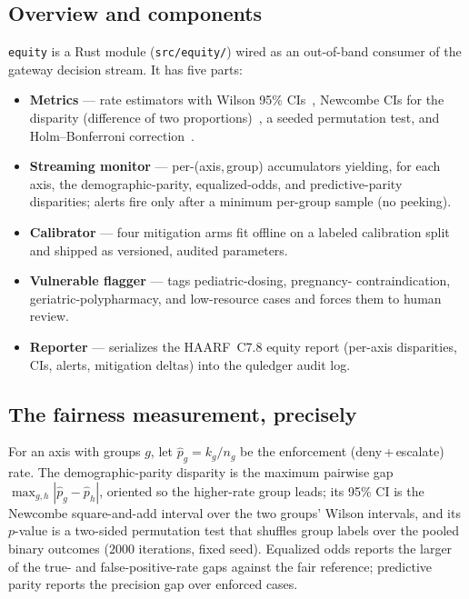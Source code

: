 \documentclass[11pt]{article}
\begin{document}
\subsection{Overview and components}
\texttt{equity} is a Rust module (\texttt{src/equity/}) wired as an out-of-band
consumer of the gateway decision stream. It has five parts:
\begin{itemize}
  \item \textbf{Metrics} --- rate estimators with Wilson 95\% CIs~\cite{wilson1927},
  Newcombe CIs for the disparity (difference of two proportions)~\cite{newcombe1998},
  a seeded permutation test, and Holm--Bonferroni correction~\cite{holm1979}.
  \item \textbf{Streaming monitor} --- per-(axis,\,group) accumulators yielding,
  for each axis, the demographic-parity, equalized-odds, and predictive-parity
  disparities; alerts fire only after a minimum per-group sample (no peeking).
  \item \textbf{Calibrator} --- four mitigation arms fit offline on a labeled
  calibration split and shipped as versioned, audited parameters.
  \item \textbf{Vulnerable flagger} --- tags pediatric-dosing, pregnancy-
  contraindication, geriatric-polypharmacy, and low-resource cases and forces them
  to human review.
  \item \textbf{Reporter} --- serializes the HAARF~C7.8 equity report (per-axis
  disparities, CIs, alerts, mitigation deltas) into the quledger audit log.
\end{itemize}

\subsection{The fairness measurement, precisely}
For an axis with groups $g$, let $\hat p_g = k_g/n_g$ be the enforcement
(deny\,+\,escalate) rate. The demographic-parity disparity is the maximum pairwise
gap $\max_{g,h}|\hat p_g-\hat p_h|$, oriented so the higher-rate group leads; its
95\% CI is the Newcombe square-and-add interval over the two groups' Wilson
intervals, and its $p$-value is a two-sided permutation test that shuffles group
labels over the pooled binary outcomes ($2000$ iterations, fixed seed). Equalized
odds reports the larger of the true- and false-positive-rate gaps against the fair
reference; predictive parity reports the precision gap over enforced cases.
\end{document}
